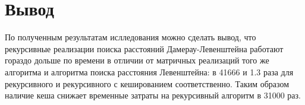 \begin{center}
	\label{img:graph_sorted1}
\end{center}

\begin{center}
	\label{img:graph_sorted2}
\end{center}
\newpage

\section{Вывод}
По полученным результатам ислледования можно сделать вывод, что рекурсивные реализации поиска расстояний Дамерау-Левенштейна работают гораздо дольше по времени в отличии от матричных реализаций того же алгоритма и алгоритма поиска расстояния Левенштейна: в 41666 и 1.3 раза для рекурсивного и рекурсивного с кешированием соответственно. Таким образом наличие кеша снижает временные затраты на рекурсивный алгоритм в 31000 раз. 
